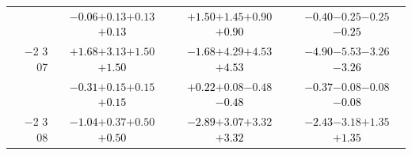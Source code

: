 \documentclass[compress]{beamer}
\begin{document}
\begin{frame}
\begin{tabular}{r | c | c | c}
          & \textcolor{black}{$-0.06$}\hspace{0.1 cm}$+0.13$\hspace{0.1 cm}$+0.13$\hspace{0.1 cm}\textcolor{black}{$+0.13$} & \textcolor{black}{$+1.50$}\hspace{0.1 cm}$+1.45$\hspace{0.1 cm}$+0.90$\hspace{0.1 cm}\textcolor{black}{$+0.90$} & \textcolor{black}{$-0.40$}\hspace{0.1 cm}$-0.25$\hspace{0.1 cm}$-0.25$\hspace{0.1 cm}\textcolor{black}{$-0.25$} \\
$-$2 3 07 & \textcolor{black}{$+1.68$}\hspace{0.1 cm}$+3.13$\hspace{0.1 cm}$+1.50$\hspace{0.1 cm}\textcolor{black}{$+1.50$} & \textcolor{black}{$-1.68$}\hspace{0.1 cm}$+4.29$\hspace{0.1 cm}$+4.53$\hspace{0.1 cm}\textcolor{black}{$+4.53$} & \textcolor{black}{$-4.90$}\hspace{0.1 cm}$-5.53$\hspace{0.1 cm}$-3.26$\hspace{0.1 cm}\textcolor{black}{$-3.26$} \\
          & \textcolor{black}{$-0.31$}\hspace{0.1 cm}$+0.15$\hspace{0.1 cm}$+0.15$\hspace{0.1 cm}\textcolor{black}{$+0.15$} & \textcolor{black}{$+0.22$}\hspace{0.1 cm}$+0.08$\hspace{0.1 cm}$-0.48$\hspace{0.1 cm}\textcolor{black}{$-0.48$} & \textcolor{black}{$-0.37$}\hspace{0.1 cm}$-0.08$\hspace{0.1 cm}$-0.08$\hspace{0.1 cm}\textcolor{black}{$-0.08$} \\
$-$2 3 08 & \textcolor{black}{$-1.04$}\hspace{0.1 cm}$+0.37$\hspace{0.1 cm}$+0.50$\hspace{0.1 cm}\textcolor{black}{$+0.50$} & \textcolor{black}{$-2.89$}\hspace{0.1 cm}$+3.07$\hspace{0.1 cm}$+3.32$\hspace{0.1 cm}\textcolor{black}{$+3.32$} & \textcolor{black}{$-2.43$}\hspace{0.1 cm}$-3.18$\hspace{0.1 cm}$+1.35$\hspace{0.1 cm}\textcolor{black}{$+1.35$} \\

\end{tabular}
\end{frame}
\end{document}
